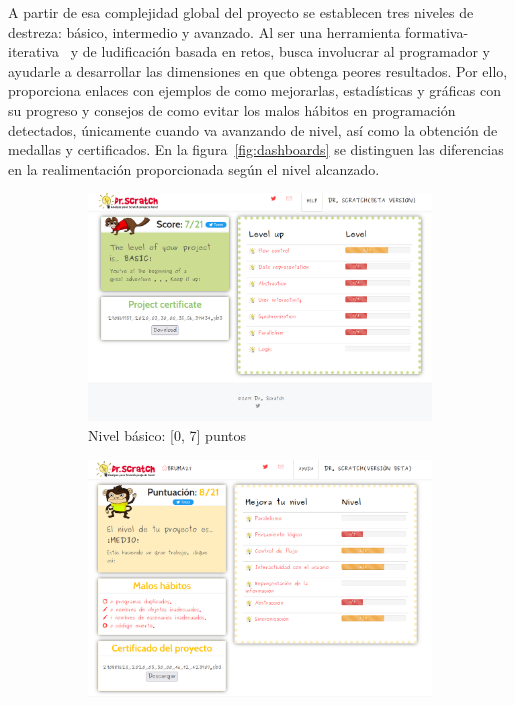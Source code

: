 \documentclass[a4paper, 12pt]{book}
\begin{document}
A partir de esa complejidad global del proyecto se establecen tres niveles de destreza: básico, intermedio y avanzado. Al ser una herramienta formativa-iterativa~\cite{roman2019combining} y de ludificación basada en retos, busca involucrar al programador y ayudarle a desarrollar las dimensiones en que obtenga peores resultados. Por ello, proporciona enlaces con ejemplos de como mejorarlas, estadísticas y gráficas con su progreso y consejos de como evitar los malos hábitos en programación detectados, únicamente cuando va avanzando de nivel, así como la obtención de medallas y certificados. En la figura~\ref{fig:dashboards} se distinguen las diferencias en la realimentación proporcionada según el nivel alcanzado.

\begin{figure}[H]
    \centering
    \begin{subfigure}[h]{.325\textwidth} 
        \includegraphics[width=\textwidth]{img/basico_Scratch}
        \caption{Nivel básico: [0, 7] puntos}
    \end{subfigure}       
    \begin{subfigure}[h]{.325\textwidth} 
        \includegraphics[width=\textwidth]{img/medio_Scratch}

\end{subfigure}
\end{figure}
\end{document}
